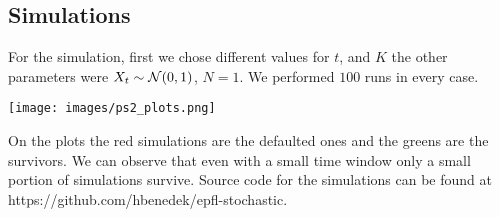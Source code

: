 \subsection*{Simulations}
For the simulation, first we chose different values for $t$, and $K$ the other parameters were $X_t\sim \mathcal{N}(0, 1)$, $N=1$. We performed $100$ runs in every case. 
\begin{center}
    \texttt{[image: images/ps2\_plots.png]}
\end{center}
On the plots the red simulations are the defaulted ones and the greens are the survivors. We can observe that even with a small time window only a small portion of simulations survive. Source code for the simulations can be found at https://github.com/hbenedek/epfl-stochastic.
